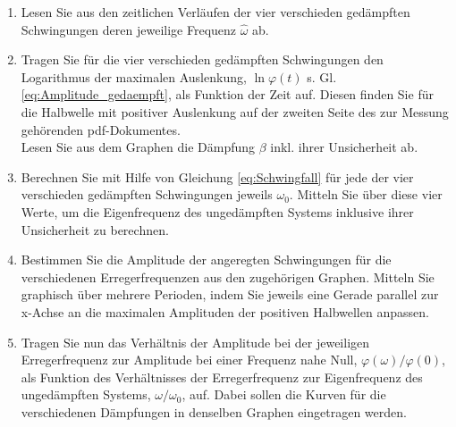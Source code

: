 \begin{enumerate}
	\item \label{aw:Schwingfall} Lesen Sie aus den zeitlichen Verläufen der vier verschieden gedämpften Schwingungen deren jeweilige Frequenz $\hat{\omega}$ ab.
	\item \label{aw:Log_Dekrement}Tragen Sie für die vier verschieden gedämpften Schwingungen den Logarithmus der maximalen Auslenkung, $\ln\varphi(t)$ s. Gl. \ref{eq:Amplitude_gedaempft}, als Funktion der Zeit auf. Diesen finden Sie für die Halbwelle mit positiver Auslenkung auf der zweiten Seite des zur Messung gehörenden pdf-Dokumentes. \\
	Lesen Sie aus dem Graphen die Dämpfung $\beta$ inkl. ihrer Unsicherheit ab.
	\item Berechnen Sie mit Hilfe von Gleichung \ref{eq:Schwingfall} für jede der vier verschieden gedämpften Schwingungen jeweils $\omega_0$. Mitteln Sie über diese vier Werte, um die Eigenfrequenz des ungedämpften Systems inklusive ihrer Unsicherheit zu berechnen.
	\item Bestimmen Sie die Amplitude der angeregten Schwingungen für die verschiedenen Erregerfrequenzen aus den zugehörigen Graphen. Mitteln Sie graphisch über mehrere Perioden, indem Sie jeweils eine Gerade parallel zur x-Achse  an die maximalen Amplituden der positiven Halbwellen anpassen. 
	\item Tragen Sie nun das Verhältnis der Amplitude bei der jeweiligen Erregerfrequenz zur Amplitude bei einer Frequenz nahe Null, $\varphi(\omega)/\varphi(0)$, als Funktion des Verhältnisses der Erregerfrequenz zur Eigenfrequenz des ungedämpften Systems, $\omega/\omega_0$, auf. Dabei sollen die Kurven für die verschiedenen Dämpfungen in denselben Graphen eingetragen werden.
\end{enumerate}